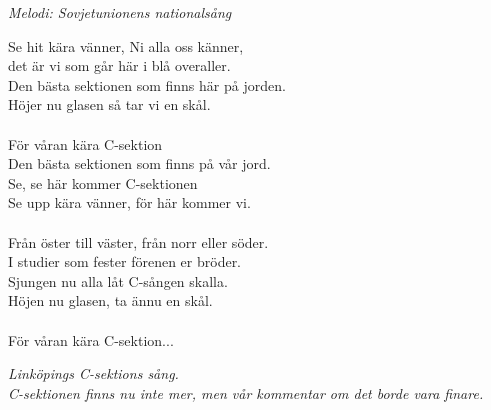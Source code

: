 {\footnotesize\textit{Melodi: Sovjetunionens nationalsång}}\par
\vspace{10pt}
Se hit kära vänner, Ni alla oss känner,\\
det är vi som går här i blå overaller.\\
Den bästa sektionen som finns här på jorden.\\
Höjer nu glasen så tar vi en skål.\\
\\
\revrpt För våran kära C-sektion \rpt\\
Den bästa sektionen som finns på vår jord.\\
\revrpt Se, se här kommer C-sektionen \rpt\\
Se upp kära vänner, för här kommer vi.\\
\\
Från öster till väster, från norr eller söder.\\
I studier som fester förenen er bröder.\\
Sjungen nu alla låt C-sången skalla.\\
Höjen nu glasen, ta ännu en skål.\\
\\
För våran kära C-sektion...
\par
\vspace{10pt}
{\footnotesize\textit{Linköpings C-sektions sång. \\
					 C-sektionen finns nu inte mer, men vår kommentar om det borde vara finare.}}

